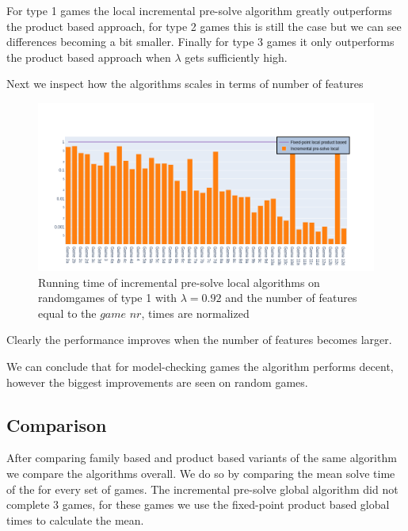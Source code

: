 For type 1 games the local incremental pre-solve algorithm greatly outperforms the product based approach, for type 2 games this is still the case but we can see differences becoming a bit smaller. Finally for type 3 games it only outperforms the product based approach when $\lambda$ gets sufficiently high.

Next we inspect how the algorithms scales in terms of number of features
\begin{figure}[H]
	\includegraphics[width=1\linewidth]{"results/randomscalegames/Fixed-point local product based_Incremental pre-solve local_"}
	\caption{Running time of incremental pre-solve local algorithms on randomgames of type 1 with $\lambda = 0.92$ and the number of features equal to the $\textit{game nr}$, times are normalized}
	\label{fig:elevatorzlnks}
\end{figure}%
Clearly the performance improves when the number of features becomes larger.

We can conclude that for model-checking games the algorithm performs decent, however the biggest improvements are seen on random games.
\subsection{Comparison}
After comparing family based and product based variants of the same algorithm we compare the algorithms overall. We do so by comparing the mean solve time of the for every set of games. The incremental pre-solve global algorithm did not complete 3 games, for these games we use the fixed-point product based global times to calculate the mean.

